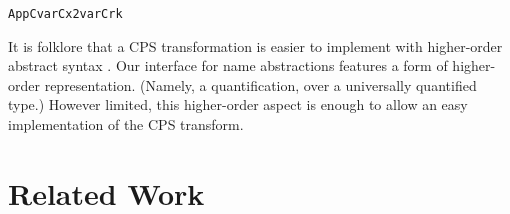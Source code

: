 \documentclass[9pt,preprint,authoryear]{sigplanconf}
\begin{document}
{{{}\vphantom{$\{$}}}\textcolor[rgb]{0,0,0.80}{\texttt{\mbox{\hspace{0.50em}}}}\textcolor[rgb]{0,0,0.80}{\texttt{\mbox{\hspace{0.50em}}}}\textcolor[rgb]{0,0,0.80}{\texttt{\mbox{\hspace{0.50em}}}}\textcolor[rgb]{0,0,0.80}{\texttt{\mbox{\hspace{0.50em}}}}\textcolor[rgb]{0,0,0.80}{\texttt{\mbox{\hspace{0.50em}}}}\textcolor[rgb]{0,0,0.80}{\texttt{\mbox{\hspace{0.50em}}}}\textcolor[rgb]{0,0,0.80}{\texttt{\mbox{\hspace{0.50em}}}}\textcolor[rgb]{0.70,0.13,0.13}{\texttt{AppC}}\textcolor[rgb]{0,0,0.80}{\texttt{\mbox{\hspace{0.50em}}}}\textcolor[cmyk]{0,0.65,0.99,0}{\texttt{\makebox[1.22ex][l]{$ {(} $}}}\textcolor[rgb]{0,0,0.80}{\texttt{varC}}\textcolor[rgb]{0,0,0.80}{\texttt{\mbox{\hspace{0.50em}}}}\textcolor[rgb]{0,0,0.80}{\texttt{x2}}\textcolor[cmyk]{0,0.65,0.99,0}{\texttt{\makebox[1.22ex][r]{$ {)} $}}}\textcolor[rgb]{0,0,0.80}{\texttt{\mbox{\hspace{0.50em}}}}\textcolor[cmyk]{0,0.65,0.99,0}{\texttt{\makebox[1.22ex][l]{$ {(} $}}}\textcolor[rgb]{0,0,0.80}{\texttt{varC}}\textcolor[rgb]{0,0,0.80}{\texttt{\mbox{\hspace{0.50em}}}}\textcolor[rgb]{0,0,0.80}{\texttt{r}}\textcolor[cmyk]{0,0.65,0.99,0}{\texttt{\makebox[1.22ex][r]{$ {)} $}}}\textcolor[cmyk]{0,0.65,0.99,0}{\texttt{\makebox[1.22ex][r]{$ {)} $}}}\textcolor[rgb]{0,0,0.80}{\texttt{\mbox{\hspace{0.50em}}}}\textcolor[rgb]{0,0,0.80}{\texttt{k}}\textcolor[rgb]{0,0,0.80}{\texttt{{\nopagebreak \newline%
}\vphantom{$\{$}}}%


%
It is folklore that a CPS transformation is easier
    to implement with higher-order abstract syntax
    \cite{guillemette_type-preserving_2008,washburn_boxes_2003}. Our
    interface for name abstractions features a form of higher-order
    representation. (Namely, a quantification, over a universally
    quantified type.) However limited, this higher-order aspect is
    enough to allow an easy implementation of the CPS transform.%


\section{Related Work\label{comparison}}
\end{document}
